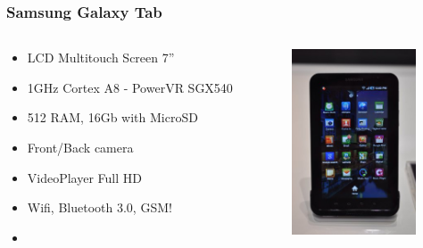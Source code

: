 \documentclass{beamer}
\begin{document}
\begin{frame}
\frametitle{Samsung Galaxy Tab}

\begin{columns}
\begin{column}{0.5\textwidth}

\begin{itemize}

\item LCD Multitouch Screen 7''
\item 1GHz Cortex A8 - PowerVR SGX540
\item 512 RAM, 16Gb with MicroSD
\item Front/Back camera
\item VideoPlayer Full HD
\item Wifi, Bluetooth 3.0, GSM!
\item {}
\end{itemize}
\end{column}

\begin{column}{0.5\textwidth}
\begin{center}
  \includegraphics[height=5.5cm]{figs/galaxy-tab}
\end{center}
\end{column}
\end{columns}

\end{frame}

%
%
%
%
\end{document}
